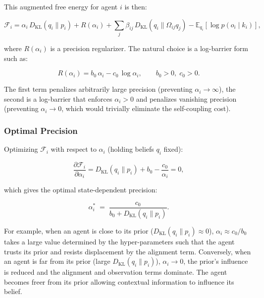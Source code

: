 \documentclass[twoside,11pt]{article}
\begin{document}
This augmented free energy for agent $i$ is then:

\begin{equation}
\mathcal{F}_i = \alpha_i\,D_{\mathrm{KL}}(q_i \| p_i)
+ R(\alpha_i)
+ \sum_j \beta_{ij}\,D_{\mathrm{KL}}(q_i \| \Omega_{ij} q_j)
- \mathbb{E}_{q_i}[\log p(o_i \mid k_i)],
\label{eq:free_energy_adaptive}
\end{equation}

where $R(\alpha_i)$ is a precision regularizer. The natural choice is a log-barrier form such as:

\begin{equation}
R(\alpha_i) = b_0\,\alpha_i - c_0\,\log \alpha_i, \qquad b_0 > 0,\; c_0 > 0.
\label{eq:precision_regularizer}
\end{equation}

The first term penalizes arbitrarily large precision (preventing $\alpha_i \to \infty$),  the second is a log-barrier that enforces $\alpha_i > 0$ and penalizes vanishing precision (preventing $\alpha_i \to 0$, which would trivially eliminate the self-coupling cost). 

\subsubsection{Optimal Precision}

Optimizing $\mathcal{F}_i$ with respect to $\alpha_i$ (holding beliefs $q_i$ fixed):

\begin{equation}
\frac{\partial \mathcal{F}_i}{\partial \alpha_i}
= D_{\mathrm{KL}}(q_i \| p_i) + b_0 - \frac{c_0}{\alpha_i} = 0,
\end{equation}

which gives the optimal state-dependent precision:

\begin{equation}
\boxed{
\alpha_i^*
\;=\; \frac{c_0}{b_0 + D_{\mathrm{KL}}(q_i \| p_i)}.
}
\label{eq:state_dependent_alpha}
\end{equation}

For example, when an agent is close to its prior ($D_{\mathrm{KL}}(q_i \| p_i) \approx 0$), $\alpha_i \approx c_0/b_0$ takes a large value determined by the hyper-parameters such that the agent trusts its prior and resists displacement by the alignment term. Conversely, when an agent is far from its prior (large $D_{\mathrm{KL}}(q_i \| p_i)$), $\alpha_i \to 0$,  the prior's influence is reduced and the alignment and observation terms dominate. The agent becomes freer from its prior allowing contextual information to influence its belief.
\end{document}
